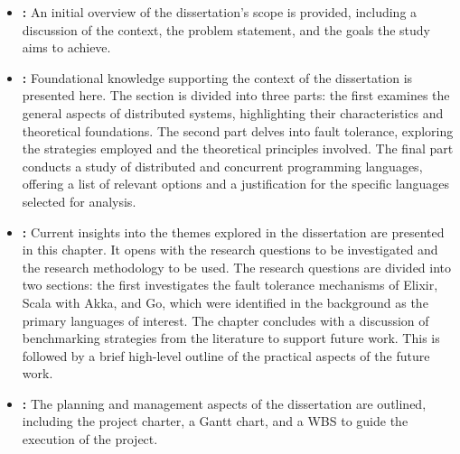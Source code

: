 \begin{itemize}
    \item \textbf{:} An initial overview of the dissertation's scope is provided, including a discussion of the context, the problem statement, and the goals the study aims to achieve.
    \item \textbf{:} Foundational knowledge supporting the context of the dissertation is presented here. The section is divided into three parts: the first examines the general aspects of distributed systems, highlighting their characteristics and theoretical foundations. The second part delves into fault tolerance, exploring the strategies employed and the theoretical principles involved. The final part conducts a study of distributed and concurrent programming languages, offering a list of relevant options and a justification for the specific languages selected for analysis.
    \item \textbf{:} Current insights into the themes explored in the dissertation are presented in this chapter. It opens with the research questions to be investigated and the research methodology to be used. The research questions are divided into two sections: the first investigates the fault tolerance mechanisms of Elixir, Scala with Akka, and Go, which were identified in the background as the primary languages of interest. The chapter concludes with a discussion of benchmarking strategies from the literature to support future work. This is followed by a brief high-level outline of the practical aspects of the future work.
    \item \textbf{:} The planning and management aspects of the dissertation are outlined, including the project charter, a Gantt chart, and a \gls{WBS} to guide the execution of the project.
\end{itemize}






